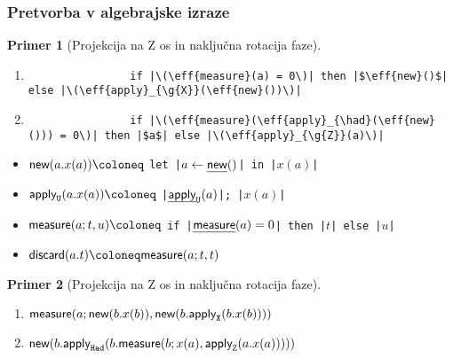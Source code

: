 \documentclass[slovene]{beamer}
\newcommand{\ul}[1]{\uline{#1}}
\newtheorem{primer}{Primer}
\newcommand{\p}[1]{\left( {#1} \right)}
\newcommand{\had}{\mathtt{Had}}
\newcommand{\g}[1]{\mathtt{#1}}
\newcommand{\cmd}[1]{\textnormal{\sffamily#1}}
\newcommand{\eff}[1]{\textnormal{\sffamily\ul{#1}}}
\newcommand{\tnew}[2]{\cmd{new}{\p{#1.#2}}}
\newcommand{\tapply}[3]{\cmd{apply}_{\g #1}{\p{#2.#3}}}
\newcommand{\tmeasure}[3]{\cmd{measure}{\p{#1; #2,#3}}}
\newcommand{\tdiscard}[2]{\cmd{discard}{\p{#1.#2}}}
\begin{document}
\begin{frame}[fragile]
    \frametitle{Pretvorba v algebrajske izraze}

    \begin{primer}[Projekcija na Z os in naključna rotacija faze]
        \begin{enumerate}
            \item \begin{verbatim}
                if |\(\eff{measure}(a) = 0\)| then |$\eff{new}()$| else |\(\eff{apply}_{\g{X}}(\eff{new}())\)|
            \end{verbatim}
            \item \begin{verbatim}
                if |\(\eff{measure}(\eff{apply}_{\had}(\eff{new}())) = 0\)| then |$a$| else |\(\eff{apply}_{\g{Z}}(a)\)|
            \end{verbatim}
        \end{enumerate}
    \end{primer}
    \pause
    \begin{itemize}
        \item \(\tnew{a}{x(a)} \coloneq\) 
            \texttt{let |\(a \leftarrow\eff{new}()\)| in |$x(a)$|}
        \item \(\tapply{U}{a}{x(a)} \coloneq\) 
            \texttt{|\(\eff{apply}_{\g{U}}(a)\)|; |$x(a)$|}
        \item \(\tmeasure{a}{t}{u} \coloneq\) 
            \texttt{if |\(\eff{measure}(a) = 0\)| then |$t$| else |$u$|}
        \item \(\tdiscard{a}{t} \coloneq \tmeasure{a}{t}{t}\)
    \end{itemize}
    \pause
    \begin{primer}[Projekcija na Z os in naključna rotacija faze]
        \begin{enumerate}
            \item \(\tmeasure{a}{\tnew{b}{x(b)}}{\tnew{b}{\tapply{X}{b}{x(b)}}}\)
            \item \(\tnew{b}{\tapply{\had}{b}{\tmeasure{b}{x(a)}{\tapply{Z}{a}{x(a)}}}}\)
        \end{enumerate}
    \end{primer}
\end{frame}
\end{document}

